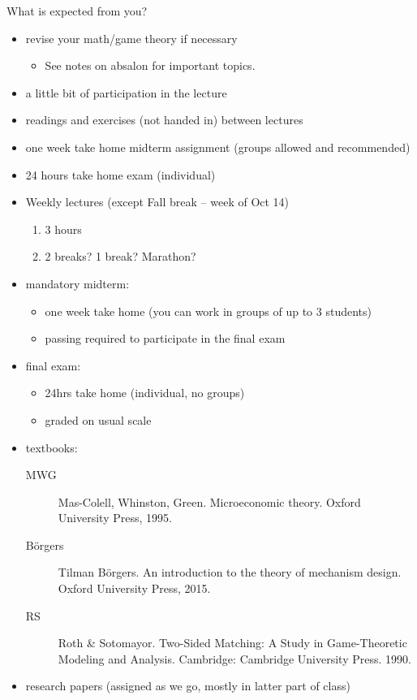 \documentclass[english,handout]{beamer}		%
\def\lyxframeend{} %
\begin{document}
What is expected from you?
\begin{itemize}
	\item revise your math/game theory if necessary
	\begin{itemize}
		\item See notes on absalon for important topics.
	\end{itemize}
	\item a little bit of participation in the lecture
	\item readings and exercises (not handed in) between lectures
	\item one week take home midterm assignment (groups allowed and recommended)
	\item 24 hours take home exam (individual)
\end{itemize}
\lyxframeend


\begin{itemize}
	\item Weekly lectures (except Fall break -- week of Oct 14)
	\begin{enumerate}
		\item 3 hours
		\item 2 breaks? 1 break? Marathon?
	\end{enumerate}

	\pause
	\item mandatory midterm:
	\begin{itemize}
		\item one week take home (you can work in groups of up to 3 students)
		\item passing required to participate in the final exam
	\end{itemize}
	
	\item final exam:
	\begin{itemize}
		\item 24hrs take home (individual, no groups)
		\item graded on usual scale
	\end{itemize}
\end{itemize}
\lyxframeend


\begin{itemize}
	\item textbooks:
	\begin{description}
		\item[MWG] Mas-Colell,  Whinston, Green. Microeconomic theory. Oxford University Press, 1995. 
		\item[B\"{o}rgers] Tilman B\"{o}rgers. An introduction to the theory of mechanism design. Oxford University Press, 2015.
		\item[RS] Roth \& Sotomayor. Two-Sided Matching: A Study in Game-Theoretic Modeling and Analysis. Cambridge: Cambridge University Press. 1990. 
	\end{description}
	\item research papers (assigned as we go, mostly in latter part of class)
\end{itemize}
\lyxframeend
\end{document}
